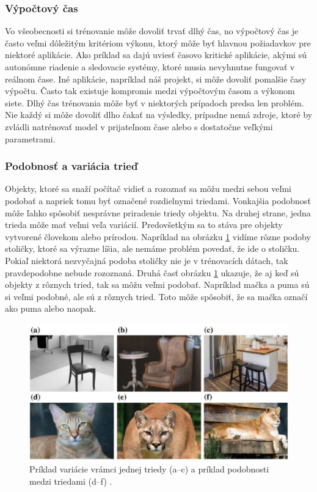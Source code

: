 
\subsubsection{Výpočtový čas}
Vo všeobecnosti si trénovanie môže dovoliť trvať dlhý čas, no výpočtový čas je často veľmi dôležitým kritériom výkonu, ktorý môže byť hlavnou požiadavkov pre niektoré aplikácie. Ako príklad sa dajú uviesť časovo kritické aplikácie, akými sú autonómne riadenie a sledovacie systémy, ktoré musia nevyhnutne fungovať v reálnom čase. Iné aplikácie, napríklad náš projekt, si môže dovoliť pomalšie časy výpočtu. Často tak existuje kompromis medzi výpočtovým časom a výkonom siete. Dlhý čas trénovania môže byť v niektorých prípadoch predsa len problém. Nie každý si môže dovoliť dlho čakať na výsledky, prípadne nemá zdroje, ktoré by zvládli natrénovať model v prijateľnom čase alebo s dostatočne veľkými parametrami.


\subsubsection{Podobnosť a variácia trieď}
Objekty, ktoré sa snaží počítač vidieť a rozoznať sa môžu medzi sebou veľmi podobať a napriek tomu byť označené rozdielnymi triedami. Vonkajšia podobnosť môže ľahko spôsobiť nesprávne priradenie triedy objektu. Na druhej strane, jedna trieda môže mať veľmi veľa variácií. Predovšetkým sa to stáva pre objekty vytvorené človekom alebo prírodou. Napríklad na obrázku \ref{img:ch2} vidíme rôzne podoby stoličky, ktoré sa výrazne líšia, ale nemáme problém povedať, že ide o stoličku. Pokiaľ niektorá nezvyčajná podoba stoličky nie je v trénovacích dátach, tak pravdepodobne nebude rozoznaná. Druhá časť obrázku \ref{img:ch2} ukazuje, že aj keď sú objekty z rôznych tried, tak sa môžu veľmi podobať. Napríklad mačka a puma sú si veľmi podobné, ale sú z rôznych tried. Toto môže spôsobiť, že sa mačka označí ako puma alebo naopak.

\begin{figure}[ht]
    \centering
    \includegraphics[width=1\textwidth]{images/02/challenge2.png}
    \caption{Príklad variácie vrámci jednej triedy (a–c) a príklad podobnosti medzi triedami (d–f) \cite{RosinPaulL2019RIAa}.}
    \label{img:ch2}
\end{figure}

